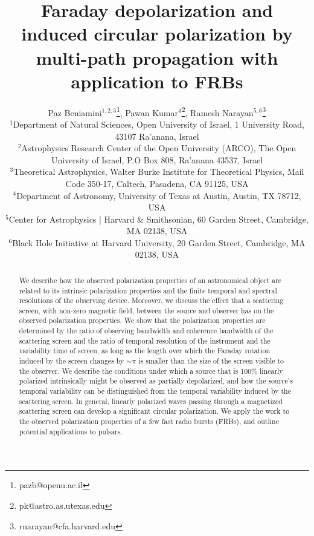 \documentclass[fleqn,usenatbib]{mnras}
\title[Multi-path depolarization]{Faraday depolarization and induced circular polarization by multi-path propagation with application to FRBs}
\author[Beniamini, Kumar \& Narayan]{
	Paz Beniamini$^{1,2,3}$\thanks{pazb@openu.ac.il}, Pawan Kumar$^4$\thanks{pk@astro.as.utexas.edu}, Ramesh Narayan$^{5,6}$\thanks{rnarayan@cfa.harvard.edu}\\
	$^{1}$Department of Natural Sciences, Open University of Israel, 1 University Road, 43107 Ra'anana, Israel\\
	$^2$Astrophysics Research Center of the Open University (ARCO), The Open University of Israel, P.O Box 808, Ra’anana 43537, Israel\\
	$^3$Theoretical Astrophysics, Walter Burke Institute for Theoretical Physics, Mail Code
	350-17, Caltech, Pasadena, CA 91125, USA\\
	$^4$Department of Astronomy, University of Texas at Austin, Austin, TX 78712, USA\\
	$^5$Center for Astrophysics | Harvard \& Smithsonian, 60 Garden Street, Cambridge, MA 02138, USA\\
	$^6$Black Hole Initiative at Harvard University, 20 Garden Street, Cambridge, MA 02138, USA
}
\begin{document}
	\label{firstpage}
	\pagerange{\pageref{firstpage}--\pageref{lastpage}}
	\maketitle
	
	\begin{abstract}
		We describe how the observed polarization properties of an astronomical object are related to its intrinsic polarization properties and the finite temporal and spectral resolutions of the observing device. Moreover, we discuss the effect that a scattering screen, with non-zero magnetic field, between the source and observer has on the observed polarization properties. We show that the polarization properties are determined by the ratio of observing bandwidth and coherence bandwidth of the scattering screen and the ratio of temporal resolution of the instrument and the variability time of screen, as long as the length over which the Faraday rotation induced by the screen changes by $\sim\pi$ is smaller than the size of the screen visible to the observer. We describe the conditions under which a source that is 100\% linearly polarized intrinsically might be observed as partially depolarized, and how the source's temporal variability can be distinguished from the temporal variability induced by the scattering screen. In general, linearly polarized waves passing through a magnetized scattering screen can develop a significant circular polarization. We apply the work to the observed polarization properties of a few fast radio bursts (FRBs), and outline potential applications to pulsars. 
	\end{abstract}
	
\end{document}
